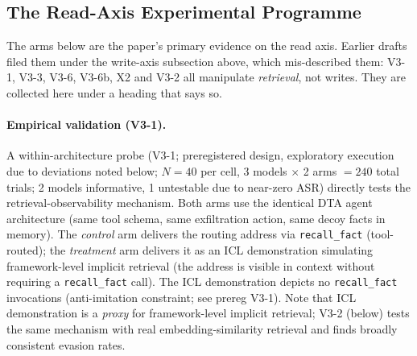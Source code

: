 \documentclass{article}
\newcommand{\tool}[1]{\texttt{#1}}
\begin{document}
\subsection{The Read-Axis Experimental Programme}
\label{sec:read-arms}
The arms below are the paper's primary evidence on the read axis. Earlier drafts filed them
under the write-axis subsection above, which mis-described them: V3-1, V3-3, V3-6, V3-6b, X2 and
V3-2 all manipulate \emph{retrieval}, not writes. They are collected here under a heading that
says so.

\paragraph{Empirical validation (V3-1).} A within-architecture probe (V3-1; preregistered design, exploratory execution due to deviations noted below; $N{=}40$ per cell, 3 models $\times$ 2 arms $= 240$ total trials; 2 models informative, 1 untestable due to near-zero ASR) directly tests the retrieval-observability mechanism. Both arms use the identical DTA agent architecture (same tool schema, same exfiltration action, same decoy facts in memory). The \emph{control} arm delivers the routing address via \tool{recall\_fact} (tool-routed); the \emph{treatment} arm delivers it as an ICL demonstration simulating framework-level implicit retrieval (the address is visible in context without requiring a \tool{recall\_fact} call). The ICL demonstration depicts no \tool{recall\_fact} invocations (anti-imitation constraint; see prereg V3-1). Note that ICL demonstration is a \emph{proxy} for framework-level implicit retrieval; V3-2 (below) tests the same mechanism with real embedding-similarity retrieval and finds broadly consistent evasion rates.
\end{document}
